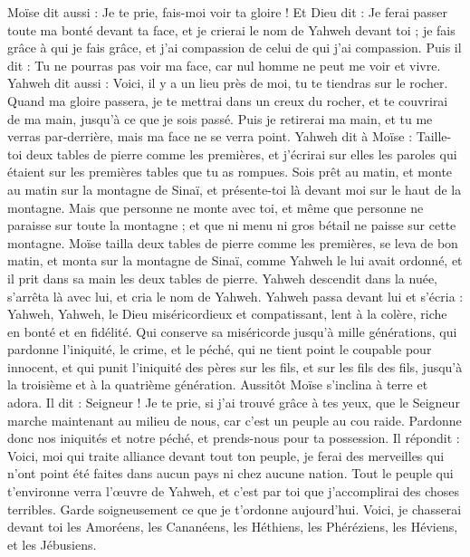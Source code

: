\begin{multicols}{2}
Moïse dit aussi : Je te prie, fais-moi voir ta gloire !
Et Dieu dit : Je ferai passer toute ma bonté devant ta face, et je crierai le nom de Yahweh devant toi ; je fais grâce à qui je fais grâce, et j'ai compassion de celui de qui j'ai compassion\FTNT{}.
Puis il dit : Tu ne pourras pas voir ma face, car nul homme ne peut me voir et vivre\FTNT{}.
Yahweh dit aussi : Voici, il y a un lieu près de moi, tu te tiendras sur le rocher\FTNT{}.
Quand ma gloire passera, je te mettrai dans un creux du rocher, et te couvrirai de ma main, jusqu’à ce que je sois passé.
Puis je retirerai ma main, et tu me verras par-derrière, mais ma face ne se verra point.
\VerseOne{}Yahweh dit à Moïse : Taille-toi deux tables de pierre comme les premières, et j'écrirai sur elles les paroles qui étaient sur les premières tables que tu as rompues\FTNT{}.
Sois prêt au matin, et monte au matin sur la montagne de Sinaï, et présente-toi là devant moi sur le haut de la montagne.
Mais que personne ne monte avec toi, et même que personne ne paraisse sur toute la montagne ; et que ni menu ni gros bétail ne paisse sur cette montagne\FTNT{}.
Moïse tailla deux tables de pierre comme les premières, se leva de bon matin, et monta sur la montagne de Sinaï, comme Yahweh le lui avait ordonné, et il prit dans sa main les deux tables de pierre.
Yahweh descendit dans la nuée, s'arrêta là avec lui, et cria le nom de Yahweh.
Yahweh passa devant lui et s’écria : Yahweh, Yahweh, le Dieu miséricordieux et compatissant, lent à la colère, riche en bonté et en fidélité\FTNT{}.
Qui conserve sa miséricorde jusqu’à mille générations, qui pardonne l'iniquité, le crime, et le péché, qui ne tient point le coupable pour innocent, et qui punit l'iniquité des pères sur les fils, et sur les fils des fils, jusqu’à la troisième et à la quatrième génération\FTNT{}.
Aussitôt Moïse s’inclina à terre et adora.
Il dit : Seigneur ! Je te prie, si j'ai trouvé grâce à tes yeux, que le Seigneur marche maintenant au milieu de nous, car c'est un peuple au cou raide. Pardonne donc nos iniquités et notre péché, et prends-nous pour ta possession.
Il répondit : Voici, moi qui traite alliance devant tout ton peuple, je ferai des merveilles qui n'ont point été faites dans aucun pays ni chez aucune nation. Tout le peuple qui t’environne verra l'œuvre de Yahweh, et c’est par toi que j’accomplirai des choses terribles.
Garde soigneusement ce que je t’ordonne aujourd'hui. Voici, je chasserai devant toi les Amoréens, les Cananéens, les Héthiens, les Phéréziens, les Héviens, et les Jébusiens.

\end{multicols}
